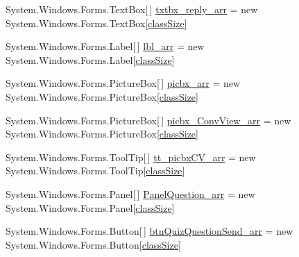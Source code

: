 \begin{DoxyCompactItemize}
\item 
\-System.\-Windows.\-Forms.\-Text\-Box\mbox{[}$\,$\mbox{]} \hyperlink{class_sr_p___classroom_inq_1_1frm_classrrom_inq_a3411157caafbe33c31a364fafd548afb}{txtbx\-\_\-reply\-\_\-arr} = new \-System.\-Windows.\-Forms.\-Text\-Box\mbox{[}\hyperlink{class_sr_p___classroom_inq_1_1frm_classrrom_inq_a78d9aab335edfe53d39036b9d89928a8}{class\-Size}\mbox{]}
\item 
\-System.\-Windows.\-Forms.\-Label\mbox{[}$\,$\mbox{]} \hyperlink{class_sr_p___classroom_inq_1_1frm_classrrom_inq_a7f0a5f5fff7a87e841b2793f89dcd997}{lbl\-\_\-arr} = new \-System.\-Windows.\-Forms.\-Label\mbox{[}\hyperlink{class_sr_p___classroom_inq_1_1frm_classrrom_inq_a78d9aab335edfe53d39036b9d89928a8}{class\-Size}\mbox{]}
\item 
\-System.\-Windows.\-Forms.\-Picture\-Box\mbox{[}$\,$\mbox{]} \hyperlink{class_sr_p___classroom_inq_1_1frm_classrrom_inq_a067a85853fc3e38cf6343917c4fb061a}{picbx\-\_\-arr} = new \-System.\-Windows.\-Forms.\-Picture\-Box\mbox{[}\hyperlink{class_sr_p___classroom_inq_1_1frm_classrrom_inq_a78d9aab335edfe53d39036b9d89928a8}{class\-Size}\mbox{]}
\item 
\-System.\-Windows.\-Forms.\-Picture\-Box\mbox{[}$\,$\mbox{]} \hyperlink{class_sr_p___classroom_inq_1_1frm_classrrom_inq_a4d179283a68569b1220534d91ddcf6d1}{picbx\-\_\-\-Conv\-View\-\_\-arr} = new \-System.\-Windows.\-Forms.\-Picture\-Box\mbox{[}\hyperlink{class_sr_p___classroom_inq_1_1frm_classrrom_inq_a78d9aab335edfe53d39036b9d89928a8}{class\-Size}\mbox{]}
\item 
\-System.\-Windows.\-Forms.\-Tool\-Tip\mbox{[}$\,$\mbox{]} \hyperlink{class_sr_p___classroom_inq_1_1frm_classrrom_inq_a2b443a71216ac1b9a63f9db496161a4d}{tt\-\_\-picbx\-C\-V\-\_\-arr} = new \-System.\-Windows.\-Forms.\-Tool\-Tip\mbox{[}\hyperlink{class_sr_p___classroom_inq_1_1frm_classrrom_inq_a78d9aab335edfe53d39036b9d89928a8}{class\-Size}\mbox{]}
\item 
\-System.\-Windows.\-Forms.\-Panel\mbox{[}$\,$\mbox{]} \hyperlink{class_sr_p___classroom_inq_1_1frm_classrrom_inq_a5c89025435cd16c638fbc91999b74f80}{\-Panel\-Question\-\_\-arr} = new \-System.\-Windows.\-Forms.\-Panel\mbox{[}\hyperlink{class_sr_p___classroom_inq_1_1frm_classrrom_inq_a78d9aab335edfe53d39036b9d89928a8}{class\-Size}\mbox{]}
\item 
\-System.\-Windows.\-Forms.\-Button\mbox{[}$\,$\mbox{]} \hyperlink{class_sr_p___classroom_inq_1_1frm_classrrom_inq_a007012d0330b5c8ad6b29271ddefe7f9}{btn\-Quiz\-Question\-Send\-\_\-arr} = new \-System.\-Windows.\-Forms.\-Button\mbox{[}\hyperlink{class_sr_p___classroom_inq_1_1frm_classrrom_inq_a78d9aab335edfe53d39036b9d89928a8}{class\-Size}\mbox{]}

\end{DoxyCompactItemize}
